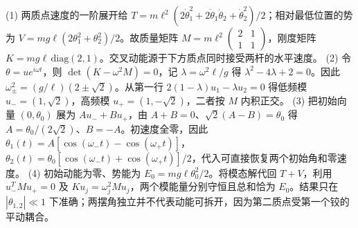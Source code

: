 (1) 两质点速度的一阶展开给 \(T=m\ell^2(2\dot\theta_1^2+2\dot\theta_1\dot\theta_2+\dot\theta_2^2)/2\)；相对最低位置的势为 \(V=mg\ell(2\theta_1^2+\theta_2^2)/2\)。故质量矩阵 \(M=m\ell^2\begin{pmatrix}2&1\\1&1\end{pmatrix}\)，刚度矩阵 \(K=mg\ell\,\mathrm{diag}(2,1)\)。交叉动能源于下方质点同时接受两杆的水平速度。
(2) 令 \(\theta=u e^{i\omega t}\)，则 \(\det(K-\omega^2M)=0\)，记 \(\lambda=\omega^2\ell/g\) 得 \(\lambda^2-4\lambda+2=0\)。因此 \(\omega_\pm^2=(g/\ell)(2\pm\sqrt2)\)。从第一行 \(2(1-\lambda)u_1-\lambda u_2=0\) 得低频模 \(u_-=(1,\sqrt2)\)，高频模 \(u_+=(1,-\sqrt2)\)，二者按 \(M\) 内积正交。
(3) 把初始向量 \((0,\theta_0)\) 展为 \(A u_-+B u_+\)，由 \(A+B=0\)、\(\sqrt2(A-B)=\theta_0\) 得 \(A=\theta_0/(2\sqrt2)\)、\(B=-A\)。初速度全零，因此 \(\theta_1(t)=A[\cos(\omega_-t)-\cos(\omega_+t)]\)，\(\theta_2(t)=\theta_0[\cos(\omega_-t)+\cos(\omega_+t)]/2\)，代入可直接恢复两个初始角和零速度。
(4) 初始动能为零、势能为 \(E_0=mg\ell\theta_0^2/2\)。将模态解代回 \(T+V\)，利用 \(u_-^TMu_+=0\) 及 \(Ku_j=\omega_j^2Mu_j\)，两个模能量分别守恒且总和恰为 \(E_0\)。结果只在 \(|\theta_{1,2}|\ll1\) 下准确；两摆角独立并不代表动能可拆开，因为第二质点受第一个铰的平动耦合。
